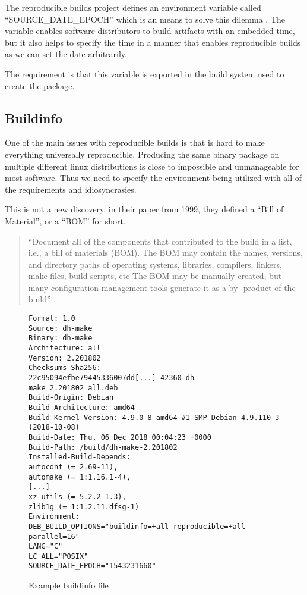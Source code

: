 \documentclass[../Main/thesis.tex]{subfiles}
\begin{document}
The reproducible builds project defines an environment variable called
``SOURCE\_DATE\_EPOCH'' which is an means to solve this dilemma
\cite{reproducible-builds-2019-source-date-epoch}. The variable enables software
distributors to build artifacts with an embedded time, but it also helps to
specify the time in a manner that enables reproducible builds as we can set the
date arbitrarily.

The requirement is that this variable is exported in the build system used to
create the package. 

\subsection*{Buildinfo}
One of the main issues with reproducible builds is that is hard to make
everything universally reproducible. Producing the same binary package on
multiple different linux distributions is close to impossible and unmanageable
for most software. Thus we need to specify the environment being utilized with
all of the requirements and idiosyncrasies.

This is not a new discovery.
\citeauthor{r.-torres-cabrera-and-bonnie-lee-appleton-1999} in their paper
 from 1999, they
defined a ``Bill of Material'', or a ``BOM'' for short.

\begin{quotation}
``Document all of the components that contributed to the build in a list, i.e.,
a bill of materials (BOM). The BOM may contain the names, versions, and
directory paths of operating systems, libraries, compilers, linkers, make-files,
build scripts, etc The BOM may be manually created, but many configuration
management tools generate it as a by- product of the build'' \cite{r.-torres-cabrera-and-bonnie-lee-appleton-1999}.
\end{quotation}

\begin{figure}[H]
\begin{verbatim}
Format: 1.0
Source: dh-make
Binary: dh-make
Architecture: all
Version: 2.201802
Checksums-Sha256:
22c95094efbe79445336007dd[...] 42360 dh-make_2.201802_all.deb
Build-Origin: Debian
Build-Architecture: amd64
Build-Kernel-Version: 4.9.0-8-amd64 #1 SMP Debian 4.9.110-3 (2018-10-08)
Build-Date: Thu, 06 Dec 2018 00:04:23 +0000
Build-Path: /build/dh-make-2.201802
Installed-Build-Depends:
autoconf (= 2.69-11),
automake (= 1:1.16.1-4),
[...]
xz-utils (= 5.2.2-1.3),
zlib1g (= 1:1.2.11.dfsg-1)
Environment:
DEB_BUILD_OPTIONS="buildinfo=+all reproducible=+all parallel=16"
LANG="C"
LC_ALL="POSIX"
SOURCE_DATE_EPOCH="1543231660"
\end{verbatim}
\caption{Example buildinfo file}
\label{fig:buildinfo}
\end{figure}
\end{document}
